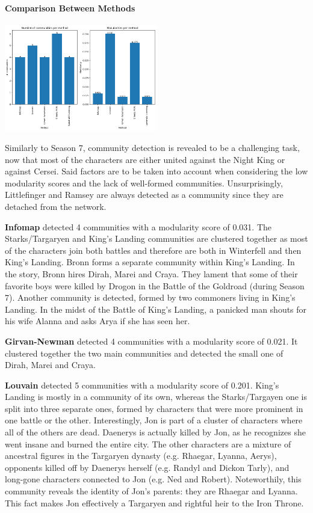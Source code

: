 \documentclass[10pt,twocolumn,letterpaper]{article}
\begin{document}
\paragraph{Comparison Between Methods}

\begin{center}
    \includegraphics[width=0.5\textwidth]{img/s8/communities_comparison.jpg}
\end{center}

Similarly to Season 7, community detection is revealed to be a challenging task, now that most of the characters are either united against the Night King or against Cersei. Said factors are to be taken into account when considering the low modularity scores and the lack of well-formed communities. Unsurprisingly, Littlefinger and Ramsey are always detected as a community since they are detached from the network. 

\textbf{Infomap} detected 4 communities with a modularity score of 0.031. The Starks/Targaryen and King's Landing communities are clustered together as most of the characters join both battles and therefore are both in Winterfell and then King's Landing. Bronn forms a separate community within King's Landing. In the story, Bronn hires Dirah, Marei and Craya. They lament that some of their favorite boys were killed by Drogon in the Battle of the Goldroad (during Season 7).
Another community is detected, formed by two commoners living in King's Landing. In the midst of the Battle of King's Landing, a panicked man shouts for his wife Alanna and asks Arya if she has seen her.

\textbf{Girvan-Newman} detected 4 communities with a modularity score of 0.021. It clustered together the two main communities and detected the small one of Dirah, Marei and Craya. 

\textbf{Louvain} detected 5 communities with a modularity score of 0.201. King's Landing is mostly in a community of its own, whereas the Starks/Targayen one is split into three separate ones, formed by characters that were more prominent in one battle or the other. Interestingly, Jon is part of a cluster of characters where all of the others are dead. Daenerys is actually killed by Jon, as he recognizes she went insane and burned the entire city. The other characters are a mixture of ancestral figures in the Targaryen dynasty (e.g. Rhaegar, Lyanna, Aerys), opponents killed off by Daenerys herself (e.g. Randyl and Dickon Tarly), and long-gone characters connected to Jon (e.g. Ned and Robert). Noteworthily, this community reveals the identity of Jon's parents: they are Rhaegar and Lyanna. This fact makes Jon effectively a Targaryen and rightful heir to the Iron Throne. 
\end{document}

